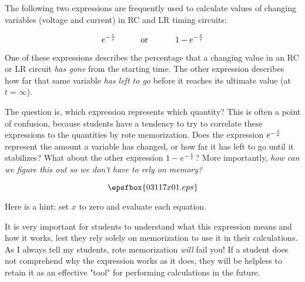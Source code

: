 

The following two expressions are frequently used to calculate values of changing variables (voltage and current) in RC and LR timing circuits:

$$e^{-{t \over \tau}} \hbox{\hskip 30pt or \hskip 30pt} 1 - e^{-{t \over \tau}}$$

One of these expressions describes the percentage that a changing value in an RC or LR circuit {\it has gone} from the starting time.  The other expression describes how far that same variable {\it has left to go} before it reaches its ultimate value (at $t = \infty$).  

The question is, which expression represents which quantity?  This is often a point of confusion, because students have a tendency to try to correlate these expressions to the quantities by rote memorization.  Does the expression $e^{-{t \over \tau}}$ represent the amount a variable has changed, or how far it has left to go until it stabilizes?  What about the other expression $1 - e^{-{t \over \tau}}$?  More importantly, {\it how can we figure this out so we don't have to rely on memory?}

$$\epsfbox{03117x01.eps}$$







Here is a hint: set $x$ to zero and evaluate each equation.







It is very important for students to understand what this expression means and how it works, lest they rely solely on memorization to use it in their calculations.  As I always tell my students, rote memorization {\it will} fail you!  If a student does not comprehend why the expression works as it does, they will be helpless to retain it as an effective "tool" for performing calculations in the future.




